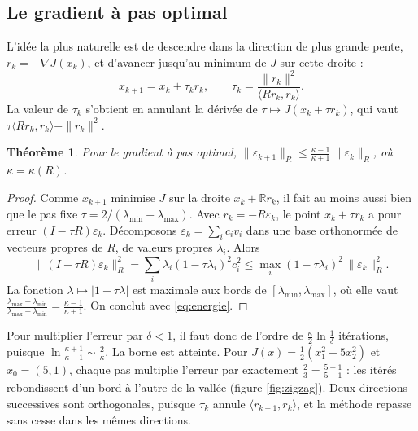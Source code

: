 \documentclass[11pt,a4paper]{article}
\theoremstyle{plain}
\newtheorem{theoreme}{Théorème}[section]
\theoremstyle{definition}
\theoremstyle{remark}
\newcommand{\R}{\mathbb{R}}
\newcommand{\ps}[2]{\langle #1,#2\rangle}
\begin{document}
\subsection{Le gradient à pas optimal}

L'idée la plus naturelle est de descendre dans la direction de plus grande pente, $r_k=-\nabla J(x_k)$, et d'avancer jusqu'au minimum de $J$ sur cette droite :
\[
  x_{k+1}=x_k+\tau_kr_k,\qquad \tau_k=\frac{\|r_k\|^2}{\ps{Rr_k}{r_k}} .
\]
La valeur de $\tau_k$ s'obtient en annulant la dérivée de $\tau\mapsto J(x_k+\tau r_k)$, qui vaut $\tau\ps{Rr_k}{r_k}-\|r_k\|^2$.

\begin{theoreme}\label{thm:gpo}
Pour le gradient à pas optimal, $\displaystyle\|\varepsilon_{k+1}\|_R\leq\frac{\kappa-1}{\kappa+1}\,\|\varepsilon_k\|_R$, où $\kappa=\kappa(R)$.
\end{theoreme}

\begin{proof}
Comme $x_{k+1}$ minimise $J$ sur la droite $x_k+\R r_k$, il fait au moins aussi bien que le pas fixe $\tau=2/(\lambda_{\min}+\lambda_{\max})$. Avec $r_k=-R\varepsilon_k$, le point $x_k+\tau r_k$ a pour erreur $(I-\tau R)\varepsilon_k$. Décomposons $\varepsilon_k=\sum_ic_iv_i$ dans une base orthonormée de vecteurs propres de $R$, de valeurs propres $\lambda_i$. Alors
\[
  \|(I-\tau R)\varepsilon_k\|_R^2=\sum_i\lambda_i(1-\tau\lambda_i)^2c_i^2\leq\max_i(1-\tau\lambda_i)^2\,\|\varepsilon_k\|_R^2 .
\]
La fonction $\lambda\mapsto|1-\tau\lambda|$ est maximale aux bords de $[\lambda_{\min},\lambda_{\max}]$, où elle vaut $\frac{\lambda_{\max}-\lambda_{\min}}{\lambda_{\max}+\lambda_{\min}}=\frac{\kappa-1}{\kappa+1}$. On conclut avec \eqref{eq:energie}.
\end{proof}

Pour multiplier l'erreur par $\delta<1$, il faut donc de l'ordre de $\frac\kappa2\ln\frac1\delta$ itérations, puisque $\ln\frac{\kappa+1}{\kappa-1}\sim\frac2\kappa$. La borne est atteinte. Pour $J(x)=\frac12(x_1^2+5x_2^2)$ et $x_0=(5,1)$, chaque pas multiplie l'erreur par exactement $\frac23=\frac{5-1}{5+1}$ : les itérés rebondissent d'un bord à l'autre de la vallée (figure \ref{fig:zigzag}). Deux directions successives sont orthogonales, puisque $\tau_k$ annule $\ps{r_{k+1}}{r_k}$, et la méthode repasse sans cesse dans les mêmes directions.
\end{document}
